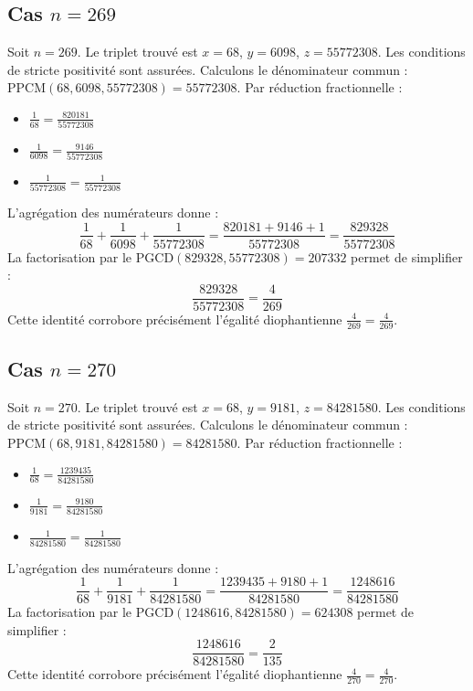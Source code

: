 \documentclass[11pt,a4paper]{article}
\begin{document}
\subsection{Cas $n = 269$}
Soit $n = 269$. Le triplet trouvé est $x = 68$, $y = 6098$, $z = 55772308$.
Les conditions de stricte positivité sont assurées.
Calculons le dénominateur commun : $\text{PPCM}(68, 6098, 55772308) = 55772308$.
Par réduction fractionnelle :
\begin{itemize}
    \item $\frac{1}{68} = \frac{820181}{55772308}$
    \item $\frac{1}{6098} = \frac{9146}{55772308}$
    \item $\frac{1}{55772308} = \frac{1}{55772308}$
\end{itemize}
L'agrégation des numérateurs donne :
$$ \frac{1}{68} + \frac{1}{6098} + \frac{1}{55772308} = \frac{820181 + 9146 + 1}{55772308} = \frac{829328}{55772308} $$
La factorisation par le $\text{PGCD}(829328, 55772308) = 207332$ permet de simplifier :
$$ \frac{829328}{55772308} = \frac{4}{269} $$
Cette identité corrobore précisément l'égalité diophantienne $\frac{4}{269} = \frac{4}{269}$.

\subsection{Cas $n = 270$}
Soit $n = 270$. Le triplet trouvé est $x = 68$, $y = 9181$, $z = 84281580$.
Les conditions de stricte positivité sont assurées.
Calculons le dénominateur commun : $\text{PPCM}(68, 9181, 84281580) = 84281580$.
Par réduction fractionnelle :
\begin{itemize}
    \item $\frac{1}{68} = \frac{1239435}{84281580}$
    \item $\frac{1}{9181} = \frac{9180}{84281580}$
    \item $\frac{1}{84281580} = \frac{1}{84281580}$
\end{itemize}
L'agrégation des numérateurs donne :
$$ \frac{1}{68} + \frac{1}{9181} + \frac{1}{84281580} = \frac{1239435 + 9180 + 1}{84281580} = \frac{1248616}{84281580} $$
La factorisation par le $\text{PGCD}(1248616, 84281580) = 624308$ permet de simplifier :
$$ \frac{1248616}{84281580} = \frac{2}{135} $$
Cette identité corrobore précisément l'égalité diophantienne $\frac{4}{270} = \frac{4}{270}$.
\end{document}
